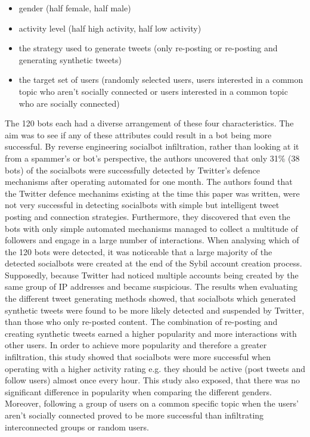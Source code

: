          \begin{itemize}
             \item gender (half female, half male)
             \item activity level (half high activity, half low activity)
             \item the strategy used to generate tweets (only re-posting or re-posting and generating synthetic tweets)
             \item the target set of users (randomly selected users, users interested in a common topic who aren't socially connected or users interested in a common topic who are socially connected)
         \end{itemize}
         The 120 bots each had a diverse arrangement of these four characteristics. The aim was to see if any of these attributes could result in a bot being more successful. By reverse engineering socialbot infiltration, rather than looking at it from a spammer's or bot's perspective, the authors uncovered that only 31\% (38 bots) of the socialbots were successfully detected by Twitter's defence mechanisms after operating automated for one month. The authors found that the Twitter defence mechanims existing at the time this paper was written, were not very successful in detecting socialbots with simple but intelligent tweet posting and connection strategies. Furthermore, they discovered that even the bots with only simple automated mechanisms managed to collect a multitude of followers and engage in a large number of interactions. When analysing which of the 120 bots were detected, it was noticeable that a large majority of the detected socialbots were created at the end of the Sybil account creation process. Supposedly, because Twitter had noticed multiple accounts being created by the same group of IP addresses and became suspicious. The results when evaluating the different tweet generating methods showed, that socialbots which generated synthetic tweets were found to be more likely detected and suspended by Twitter, than those who only re-posted content. The combination of re-posting and creating synthetic tweets earned a higher popularity and more interactions with other users.
         In order to achieve more popularity and therefore a greater infiltration, this study showed that socialbots were more successful when operating with a higher activity rating e.g. they should be active (post tweets and follow users) almost once every hour. This study also exposed, that there was no significant difference in popularity when comparing the different genders. Moreover, following a group of users on a common specific topic when the users' aren't socially connected proved to be more successful than infiltrating interconnected groups or random users.
        
